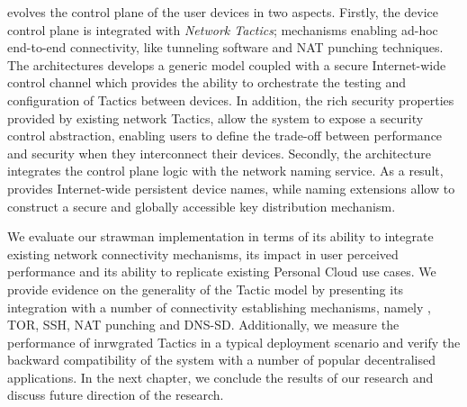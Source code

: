\signpost evolves the control plane of the user devices in two aspects. Firstly,
the device control plane is integrated with \textit{Network Tactics}; mechanisms
enabling ad-hoc end-to-end connectivity, like tunneling software and NAT
punching techniques. The architectures develops a generic model coupled with a
secure Internet-wide control channel which provides the ability to orchestrate
the testing and configuration of Tactics between devices.  In addition, the rich
security properties provided by existing network Tactics, allow the system to
expose a security control abstraction, enabling users to define the trade-off
between performance and security when they interconnect their devices.
Secondly, the architecture integrates the control plane logic with the network
naming service. As a result, \signpost provides Internet-wide persistent device
names, while \dnssec naming extensions allow \signpost to construct a secure and
globally accessible key distribution mechanism.

We evaluate our strawman \signpost implementation in terms of its ability to
integrate existing network connectivity mechanisms, its impact in user perceived
performance and its ability to replicate existing Personal Cloud use cases. We
provide evidence on the generality of the \signpost Tactic model by presenting
its integration with a number of connectivity establishing mechanisms, namely
\openvpn, TOR, SSH, NAT punching and DNS-SD.  Additionally, we measure the
performance of inrwgrated Tactics in a typical deployment scenario and verify
the backward compatibility of the system with a number of popular decentralised
applications. In the next chapter, we conclude the results of our research and
discuss future direction of the research.  



